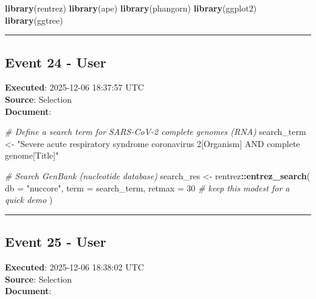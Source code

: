 \documentclass[
  11pt,
]{article}
\newenvironment{Shaded}{\begin{snugshade}}{\end{snugshade}}
\newcommand{\AttributeTok}[1]{\textcolor[rgb]{0.13,0.29,0.53}{#1}}
\newcommand{\CommentTok}[1]{\textcolor[rgb]{0.56,0.35,0.01}{\textit{#1}}}
\newcommand{\DecValTok}[1]{\textcolor[rgb]{0.00,0.00,0.81}{#1}}
\newcommand{\FunctionTok}[1]{\textcolor[rgb]{0.13,0.29,0.53}{\textbf{#1}}}
\newcommand{\NormalTok}[1]{#1}
\newcommand{\OtherTok}[1]{\textcolor[rgb]{0.56,0.35,0.01}{#1}}
\newcommand{\SpecialCharTok}[1]{\textcolor[rgb]{0.81,0.36,0.00}{\textbf{#1}}}
\newcommand{\StringTok}[1]{\textcolor[rgb]{0.31,0.60,0.02}{#1}}
\begin{document}
\begin{Shaded}
\begin{Highlighting}[]
\FunctionTok{library}\NormalTok{(rentrez)}
\FunctionTok{library}\NormalTok{(ape)}
\FunctionTok{library}\NormalTok{(phangorn)}
\FunctionTok{library}\NormalTok{(ggplot2)}
\FunctionTok{library}\NormalTok{(ggtree)}
\end{Highlighting}
\end{Shaded}

\begin{center}\rule{0.5\linewidth}{0.5pt}\end{center}

\subsection{Event 24 - User}\label{event-24---user}

\textbf{Executed}: 2025-12-06 18:37:57 UTC\\
\textbf{Source}: Selection\\
\textbf{Document}:

\begin{Shaded}
\begin{Highlighting}[]
\CommentTok{\# Define a search term for SARS{-}CoV{-}2 complete genomes (RNA)}
\NormalTok{search\_term }\OtherTok{\textless{}{-}} \StringTok{"Severe acute respiratory syndrome coronavirus 2[Organism] AND complete genome[Title]"}

\CommentTok{\# Search GenBank (nucleotide database)}
\NormalTok{search\_res }\OtherTok{\textless{}{-}}\NormalTok{ rentrez}\SpecialCharTok{::}\FunctionTok{entrez\_search}\NormalTok{(}
  \AttributeTok{db =} \StringTok{"nuccore"}\NormalTok{,}
  \AttributeTok{term =}\NormalTok{ search\_term,}
  \AttributeTok{retmax =} \DecValTok{30} \CommentTok{\# keep this modest for a quick demo}
\NormalTok{)}
\end{Highlighting}
\end{Shaded}

\begin{center}\rule{0.5\linewidth}{0.5pt}\end{center}

\subsection{Event 25 - User}\label{event-25---user}

\textbf{Executed}: 2025-12-06 18:38:02 UTC\\
\textbf{Source}: Selection\\
\textbf{Document}:
\end{document}
